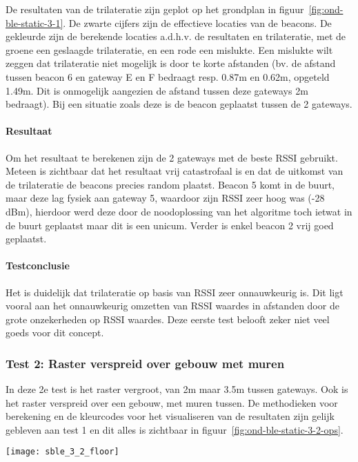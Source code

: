 De resultaten van de trilateratie zijn geplot op het grondplan in figuur~\ref{fig:ond-ble-static-3-1}. De zwarte cijfers zijn de effectieve locaties van de beacons. De gekleurde zijn de berekende locaties a.d.h.v. de resultaten en trilateratie, met de groene een geslaagde trilateratie, en een rode een mislukte. Een mislukte wilt zeggen dat trilateratie niet mogelijk is door te korte afstanden (bv. de afstand tussen beacon 6 en gateway E en F bedraagt resp. 0.87m en 0.62m, opgeteld 1.49m. Dit is onmogelijk aangezien de afstand tussen deze gateways 2m bedraagt). Bij een situatie zoals deze is de beacon geplaatst tussen de 2 gateways.

\paragraph{Resultaat}
Om het resultaat te berekenen zijn de 2 gateways met de beste RSSI gebruikt. Meteen is zichtbaar dat het resultaat vrij catastrofaal is en dat de uitkomst van de trilateratie de beacons precies random plaatst. Beacon 5 komt in de buurt, maar deze lag fysiek aan gateway 5, waardoor zijn RSSI zeer hoog was (-28 dBm), hierdoor werd deze door de noodoplossing van het algoritme toch ietwat in de buurt geplaatst maar dit is een unicum. Verder is enkel beacon 2 vrij goed geplaatst.

\paragraph{Testconclusie}
Het is duidelijk dat trilateratie op basis van RSSI zeer onnauwkeurig is. Dit ligt vooral aan het onnauwkeurig omzetten van RSSI waardes in afstanden door de grote onzekerheden op RSSI waardes. Deze eerste test belooft zeker niet veel goeds voor dit concept.

\subsubsection{Test 2: Raster verspreid over gebouw met muren}
\label{sec:ond-ble-3-2}
\begin{minipage}{0.55\textwidth}
In deze 2e test is het raster vergroot, van 2m maar 3.5m tussen gateways. Ook is het raster verspreid over een gebouw, met muren tussen. De methodieken voor berekening en de kleurcodes voor het visualiseren van de resultaten zijn gelijk gebleven aan test 1 en dit alles is zichtbaar in figuur~\ref{fig:ond-ble-static-3-2-ops}.
\end{minipage}
\hfill
\begin{minipage}{0.42\textwidth}
	\texttt{[image: sble\_3\_2\_floor]}
	\label{fig:ond-ble-static-3-2-ops}
\end{minipage}

